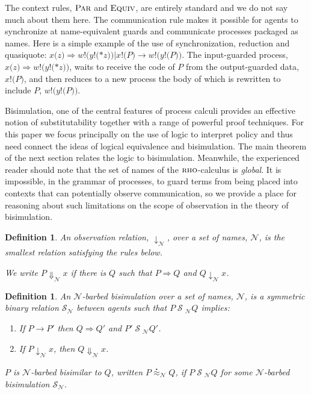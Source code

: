 \documentclass[submission,copyright,creativecommons]{eptcs}
\newcommand{\id}[1]{\texttt{#1}}
\newcommand{\juxtap}{\mathbin{\id{|}}}
\newcommand{\nameeq}{\mathbin{\equiv_N}}
\newcommand{\binpar}[2]{#1 \juxtap #2}
\newcommand{\outputp}[2]{#1 ! ( * #2 )}
\newcommand{\red}{\rightarrow}
\newcommand{\wred}{\Rightarrow}
\newcommand{\rel}[1]{\;{\mathcal #1}\;} %
\newcommand{\wbbisim}{\stackrel{\centerdot}{\approx}} %
\newtheorem{defn}[thm]{Definition}
\numberwithin{equation}{subsection}
\newcommand{\rhoc}{${\textsc{rho}}$-calculus}
\begin{document}
The context rules, $\textsc{Par}$ and $\textsc{Equiv}$, are entirely standard and we do
not say much about them here. The communication rule makes it possible
for agents to synchronize at name-equivalent guards and communicate
processes packaged as names. Here is a simple example of the use of
synchronization, reduction and quasiquote: $x{(}{z}{)} \Rightarrow
{w}{!}{(}{y}{!}{(}{*}{z}{)}{)} \juxtap x{!}{(}{P}{)} \red
{w}{!}{(}{y}{!}{(}P{)}{)}$. The input-guarded process, $x{(}{z}{)}
\Rightarrow {w}{!}{(}{y}{!}{(}{*}{z}{)}{)}$, waits to receive the code
of $P$ from the output-guarded data, $x{!}{(}{P}{)}$, and then reduces
to a new process the body of which is rewritten to include $P$,
${w}{!}{(}{y}{!}{(}P{)}{)}$.

Bisimulation, one of the central features of process calculi provides
an effective notion of substitutability together with a range of
powerful proof techniques. For this paper we focus principally on the
use of logic to interpret policy and thus need connect the ideas of
logical equivalence and bisimulation. The main theorem of the next
section relates the logic to bisimulation. Meanwhile, the experienced
reader should note that the set of names of the {\rhoc} is
\textit{global}. It is impossible, in the grammar of processes, to
guard terms from being placed into contexts that can potentially
observe communication, so we provide a place for reasoning about such
limitations on the scope of observation in the theory of bisimulation.

\begin{defn}
An \emph{observation relation}, $\downarrow_{\mathcal N}$, over a set
of names, $\mathcal N$, is the smallest relation satisfying the rules
below.


We write $P \Downarrow_{\mathcal N} x$ if there is $Q$ such that 
$P \wred Q$ and $Q \downarrow_{\mathcal N} x$.
\end{defn}

\begin{defn}
An  ${\mathcal N}$-\emph{barbed bisimulation} over a set of names, ${\mathcal N}$, is a symmetric binary relation 
${\mathcal S}_{\mathcal N}$ between agents such that $P\rel{S}_{\mathcal N}Q$ implies:
\begin{enumerate}
\item If $P \red P'$ then $Q \wred Q'$ and $P'\rel{S}_{\mathcal N} Q'$.
\item If $P\downarrow_{\mathcal N} x$, then $Q\Downarrow_{\mathcal N} x$.
\end{enumerate}
$P$ is ${\mathcal N}$-barbed bisimilar to $Q$, written
$P \wbbisim_{\mathcal N} Q$, if $P \rel{S}_{\mathcal N} Q$ for some ${\mathcal N}$-barbed bisimulation ${\mathcal S}_{\mathcal N}$.
\end{defn}
\end{document}
